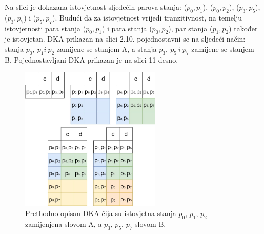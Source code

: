 \documentclass[titlepage]{article}
\begin{document}
\newline
Na slici je dokazana istovjetnost sljedećih parova stanja: ($p_0,p_1$),  ($p_0,p_2$),  ($p_3,p_5$),  ($p_3,p_7$) i  ($p_5,p_7$). Budući da za istovjetnost vrijedi tranzitivnost, na temelju istovjetnosti para stanja ($p_0, p_1$) i para stanja ($p_0, p_2$), par stanja ($p_1, p_2$) također je istovjetan. DKA prikazan na slici 2.10. pojednostavni se na sljedeći način: stanja $p_0,\ p_1 i\ p_2$ zamijene se stanjem A, a stanja $p_3,\ p_5\ i\ p_7$ zamijene se stanjem B. Pojednostavljani DKA prikazan je na slici 11 desno.
\begin{figure}[h]
\centering
\includegraphics[width=0.6\textwidth]{2_9.jpg}
\caption{Prethodno opisan DKA čija su istovjetna stanja $p_0$, $p_1$, $p_2$ zamijenjena slovom A, a $p_3$, $p_5$, $p_7$ slovom B.}
\end{figure}
\end{document}
